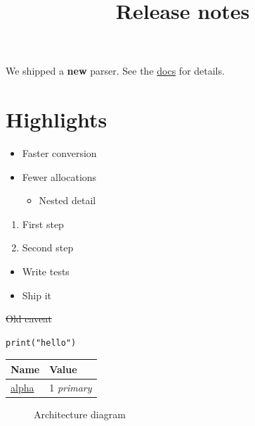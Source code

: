 \documentclass[11pt,a4paper]{article}
\title{Release notes}
\begin{document}
\maketitle

We shipped a \textbf{new} parser. See the \href{https://example.com/docs}{docs} for details.

\section{Highlights}

\begin{itemize}
\item Faster conversion
\item Fewer allocations
  \begin{itemize}
\item Nested detail
  \end{itemize}
\end{itemize}

\begin{enumerate}
\item First step
\item Second step
\end{enumerate}

\begin{itemize}
\item [x] Write tests
\item [ ] Ship it
\end{itemize}

\sout{Old caveat}

\begin{verbatim}
print("hello")
\end{verbatim}

\begin{table}[h]
\begin{tabular}{|l|l|}
\hline
Name & Value \\ \hline
\href{https://example.com/alpha}{alpha} & 1  \textit{primary} \\ \hline
\end{tabular}
\end{table}

\begin{figure}[h]
\caption{Architecture diagram}
\end{figure}
\end{document}
